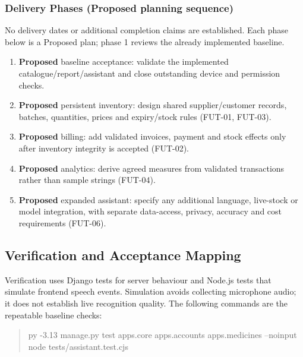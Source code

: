 \documentclass{article}
\newcommand{\Proposed}{\textbf{Proposed}}
\begin{document}
\subsubsection{Delivery Phases (Proposed planning sequence)}
No delivery dates or additional completion claims are established. Each phase below is a Proposed plan; phase 1 reviews the already implemented baseline.
\begin{enumerate}
\item \Proposed{} baseline acceptance: validate the implemented catalogue/report/assistant and close outstanding device and permission checks.
\item \Proposed{} persistent inventory: design shared supplier/customer records, batches, quantities, prices and expiry/stock rules (FUT-01, FUT-03).
\item \Proposed{} billing: add validated invoices, payment and stock effects only after inventory integrity is accepted (FUT-02).
\item \Proposed{} analytics: derive agreed measures from validated transactions rather than sample strings (FUT-04).
\item \Proposed{} expanded assistant: specify any additional language, live-stock or model integration, with separate data-access, privacy, accuracy and cost requirements (FUT-06).
\end{enumerate}

\subsection{Verification and Acceptance Mapping}
Verification uses Django tests for server behaviour and Node.js tests that simulate frontend speech events. Simulation avoids collecting microphone audio; it does not establish live recognition quality. The following commands are the repeatable baseline checks:
\begin{quote}\small\ttfamily
py -3.13 manage.py test apps.core apps.accounts apps.medicines --noinput\\
node tests/assistant.test.cjs
\end{quote}
\end{document}
